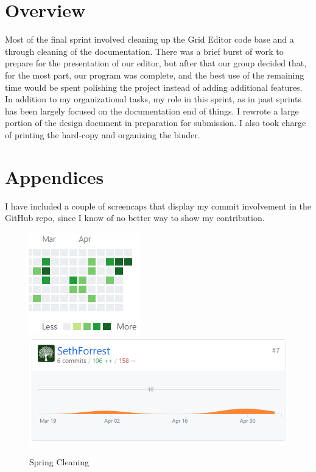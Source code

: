 \documentclass[letterpaper,12pt]{texMemo}
\begin{document}
\maketitle

\section*{ Overview }

Most of the final sprint involved cleaning up the Grid Editor code base and a through cleaning of the documentation. There was a brief burst of work to prepare for the presentation of our editor, but after that our group decided that, for the most part, our program was complete, and the best use of the remaining time would be spent polishing the project instead of adding additional features.
\\
In addition to my organizational tasks, my role in this sprint, as in past sprints has been largely focused on the documentation end of things. I rewrote a large portion of the design document in preparation for submission. I also took charge of printing the hard-copy and organizing the binder.


\section*{ Appendices }

I have included a couple of screencaps that display my commit involvement in the GitHub repo, since I know of no better way to show my contribution.

\begin{figure}[h]
  \centering
  \includegraphics[width=.4\linewidth]{git_contrib} 
  \includegraphics[width=.4\linewidth]{grid_commits}
  \caption{Spring Cleaning}
\end{figure}
\end{document}
